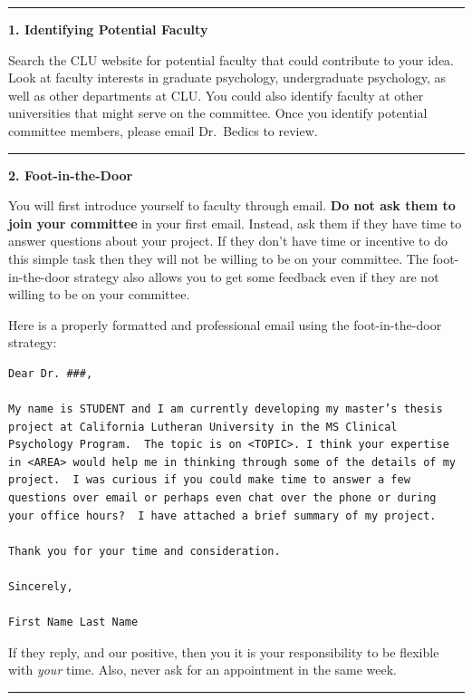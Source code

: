 \documentclass[openany]{book}
\begin{document}
\begin{center}\rule{0.5\linewidth}{0.5pt}\end{center}

\textbf{1. Identifying Potential Faculty}

Search the CLU website for potential faculty that could contribute to your idea. Look at faculty interests in graduate psychology, undergraduate psychology, as well as other departments at CLU. You could also identify faculty at other universities that might serve on the committee. Once you identify potential committee members, please email Dr.~Bedics to review.

\begin{center}\rule{0.5\linewidth}{0.5pt}\end{center}

\textbf{2. Foot-in-the-Door}

You will first introduce yourself to faculty through email. \textbf{Do not ask them to join your committee} in your first email. Instead, ask them if they have time to answer questions about your project. If they don't have time or incentive to do this simple task then they will not be willing to be on your committee. The foot-in-the-door strategy also allows you to get some feedback even if they are not willing to be on your committee.

Here is a properly formatted and professional email using the foot-in-the-door strategy:

\begin{verbatim}
Dear Dr. ###,

My name is STUDENT and I am currently developing my master’s thesis project at California Lutheran University in the MS Clinical Psychology Program.  The topic is on <TOPIC>. I think your expertise in <AREA> would help me in thinking through some of the details of my project.  I was curious if you could make time to answer a few questions over email or perhaps even chat over the phone or during your office hours?  I have attached a brief summary of my project.

Thank you for your time and consideration.

Sincerely,

First Name Last Name
\end{verbatim}

If they reply, and our positive, then you it is your responsibility to be flexible with \emph{your} time. Also, never ask for an appointment in the same week.

\begin{center}\rule{0.5\linewidth}{0.5pt}\end{center}
\end{document}

